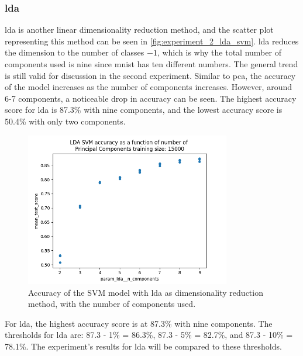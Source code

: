 \subsubsection{\gls{lda}}\label{subsubsec:experiment_2_lda}
\gls{lda} is another linear dimensionality reduction method, and the scatter plot representing this method can be seen in \autoref{fig:experiment_2_lda_svm}. \gls{lda} reduces the dimension to the number of classes $-1$, which is why the total number of components used is nine since \gls{mnist} has ten different numbers. The general trend is still valid for discussion in the second experiment.
Similar to \gls{pca}, the accuracy of the model increases as the number of components increases. However, around 6-7 components, a noticeable drop in accuracy can be seen. The highest accuracy score for \gls{lda} is 87.3\% with nine components, and the lowest accuracy score is 50.4\% with only two components. 

\begin{figure}[htb!]
    \centering
    \includegraphics[width=0.8\textwidth]{figures/experiment_two/lda_svm_15000.png}
    \caption{Accuracy of the SVM model with \gls{lda} as dimensionality reduction method, with the number of components used.}
    \label{fig:experiment_2_lda_svm}
\end{figure}

For \gls{lda}, the highest accuracy score is at 87.3\% with nine components. The thresholds for \gls{lda} are: 87.3 - 1\% = 86.3\%, 87.3 - 5\% = 82.7\%, and 87.3 - 10\% = 78.1\%. The experiment's results for \gls{lda} will be compared to these thresholds.

